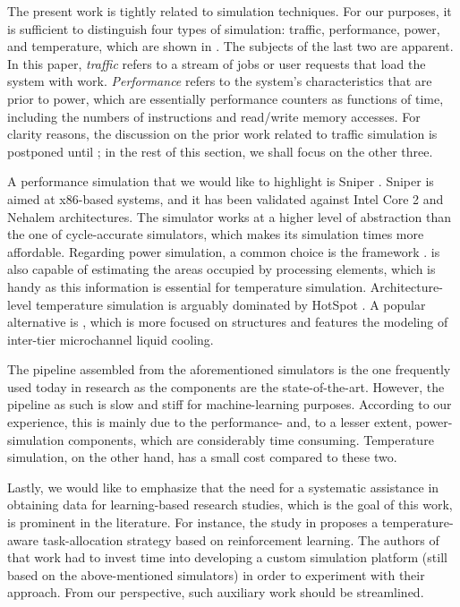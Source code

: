 The present work is tightly related to simulation techniques. For our purposes,
it is sufficient to distinguish four types of simulation: traffic, performance,
power, and temperature, which are shown in . The subjects of the
last two are apparent. In this paper, \emph{traffic} refers to a stream of jobs
or user requests that load the system with work. \emph{Performance} refers to
the system's characteristics that are prior to power, which are essentially
performance counters as functions of time, including the numbers of instructions
and read/write memory accesses. For clarity reasons, the discussion on the prior
work related to traffic simulation is postponed until ; in the
rest of this section, we shall focus on the other three.

A performance simulation that we would like to highlight is Sniper
\cite{carlson2011}. Sniper is aimed at x86-based systems, and it has been
validated against Intel Core 2 and Nehalem architectures. The simulator works at
a higher level of abstraction than the one of cycle-accurate simulators, which
makes its simulation times more affordable. Regarding power simulation, a common
choice is the  framework \cite{li2009}.  is also capable of
estimating the areas occupied by processing elements, which is handy as this
information is essential for temperature simulation. Architecture-level
temperature simulation is arguably dominated by HotSpot \cite{skadron2004}. A
popular alternative is  \cite{sridhar2010}, which is more focused on
 structures and features the modeling of inter-tier microchannel liquid
cooling.

The pipeline assembled from the aforementioned simulators is the one frequently
used today in research as the components are the state-of-the-art. However, the
pipeline as such is slow and stiff for machine-learning purposes. According to
our experience, this is mainly due to the performance- and, to a lesser extent,
power-simulation components, which are considerably time consuming. Temperature
simulation, on the other hand, has a small cost compared to these two.

Lastly, we would like to emphasize that the need for a systematic assistance in
obtaining data for learning-based research studies, which is the goal of this
work, is prominent in the literature. For instance, the study in \cite{lu2015}
proposes a temperature-aware task-allocation strategy based on reinforcement
learning. The authors of that work had to invest time into developing a custom
simulation platform (still based on the above-mentioned simulators) in order to
experiment with their approach. From our perspective, such auxiliary work should
be streamlined.
